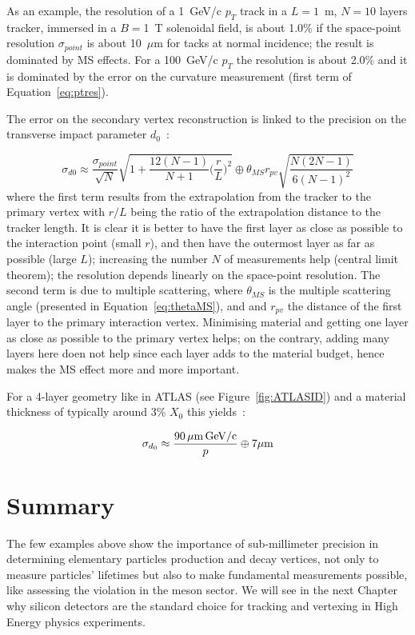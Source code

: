  As an example, the resolution of a 1~GeV/c $p_T$ track in a $L=1$~m,  
 $N=10$ layers 
 tracker, immersed in a $B=$1~T solenoidal field, is about 1.0\% if the space-point resolution   
 $\sigma_{point}$ is about 10~$\mu$m for tacks at normal incidence; the result is dominated by 
 MS effects. For a 100~GeV/c $p_T$ the resolution is about 2.0\% and it is dominated by the 
 error on the curvature measurement (first term of Equation~\ref{eq:ptres}).

The error on the secondary vertex reconstruction is linked to the precision on 
the transverse impact parameter $d_0$~\cite{Garcia-Sciveres:2017ymt}:

\begin{equation}
\sigma_{d0}\approx\dfrac{\sigma_{point}}{\sqrt{N}}\sqrt{1+\dfrac{12(N-1)}{N+1}\Big(\dfrac{r}{L}\Big)^2}\oplus\theta_{MS} r_{pv}\sqrt{\dfrac{N(2N-1)}{6(N-1)^2}}
\label{eq:d0res}
\end{equation} 
where the first term results from the extrapolation from the tracker to the primary vertex with $r/L$
being the ratio of the extrapolation distance to the tracker length. It is clear it is better to have 
the first layer as close as possible to the interaction point (small $r$), and then have 
the outermost layer as far as possible (large $L$); increasing the number $N$ of measurements 
help (central limit theorem); the resolution depends 
linearly on the space-point resolution. The second term is due to multiple scattering, where 
$\theta_{MS}$ is  the multiple scattering angle (presented in Equation~\ref{eq:thetaMS}), and and $r_{pv}$ the distance 
of the first  layer to the primary interaction vertex. Minimising material and getting one layer as 
close as possible to the primary vertex helps; on the contrary, adding many layers here doen not help 
since each layer adds to the material budget, hence makes the MS effect more and more important.

For a 4-layer geometry like in ATLAS (see Figure~\ref{fig:ATLASID}) and a material thickness of 
typically around  3\% $X_0$ this yields~\cite{Garcia-Sciveres:2017ymt}:

\begin{equation}
  \sigma_{d_{0}}\approx\dfrac{90\,\mu {\rm m\,GeV/c}}{p}\oplus7\mu {\rm m}
\end{equation}

\section{Summary}
The few examples above show the importance of sub-millimeter precision in determining elementary 
particles production  and decay vertices, not only to measure  particles' lifetimes but also 
to make fundamental measurements possible, like assessing the  \CP violation in the \B meson 
sector. We will see in the next Chapter why silicon detectors are the standard choice for tracking and 
vertexing in High Energy physics experiments.
